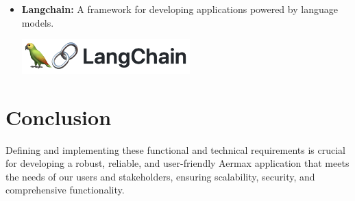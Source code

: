 \begin{itemize}
    \item \textbf{Langchain:} \newline A framework for developing applications powered by language models. \newline \newline
          \begin{minipage}{\linewidth}
              \centering
              \includegraphics[width=6.5cm]{src/assets/logos/langchain.png}
          \end{minipage}
\end{itemize}

\section{Conclusion}
Defining and implementing these functional and technical requirements is crucial for developing a robust, reliable, and user-friendly Aermax application that meets the needs of our users and stakeholders, ensuring scalability, security, and comprehensive functionality.